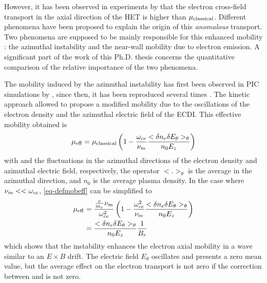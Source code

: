   However, it has been observed in experiments by \citet{meezan2001} that the electron cross-field transport in the axial direction of the \ac{HET} is higher than $\mu_{\mathrm{classical}}$.
  Different phenomena have been proposed to explain the origin of this \emph{anomalous} transport.
  Two phenomena are supposed to be mainly responsible for this enhanced mobility \citep{croes2017}\string: the azimuthal instability and the near-wall mobility due to electron emission.
  A significant part of the work of this Ph.D. thesis concerns the quantitative comparison of the relative importance of the two phenomena.
  
  The mobility induced by the azimuthal instability has first been observed in \ac{PIC} simulations by \citet{adam2004}, since then, it has been reproduced several times \citep{adam2008a,heron2013,lafleur2016a,croes2017,boeuf2018,taccogna2019}.
  The kinetic approach allowed \citet{lafleur2016a} to propose a modified mobility due to the oscillations of the electron density and the azimuthal electric field of the \ac{ECDI}.
  This effective mobility obtained is 
  \begin{equation} \label{eq-defmobeff}
    \mu_{\mathrm{eff}} = \mu_{\mathrm{classical}} \left( 1 - \frac{\omega_{ce}}{\nu_m}  \frac{< \delta n_e \delta E_{\theta} >_{\theta} }{n_0 E_z}   \right)
  \end{equation}
  with \dne{} and \dEt{} the fluctuations in the azimuthal directions of the electron density and azimuthal electric field, respectively, the operator $< . >_{\theta}$ is the average in the azimuthal direction, and $n_0$ is the average plasma density.
  In the case where $\nu_m << \omega_{ce}$, \cref{eq-defmobeff} can be simplified to 
  \begin{align} 
    \mu_{\mathrm{eff}} &= \frac{\frac{e}{m_e} \nu_m}{\omega_{ce}^2} \left( 1 - \frac{\omega_{ce}^2}{\nu_m}  \frac{< \delta n_e \delta E_{\theta} >_{\theta} }{n_0 E_z}   \right) \nonumber \\
    &= \frac{< \delta n_e \delta E_{\theta} >_{\theta} }{n_0 E_z}   \frac{1}{B_r} \label{eq-mobeffsimple}
  \end{align}
  which shows that the instability enhances the electron axial mobility in a wave similar to an $E \times B$ drift.
  The electric field $E_{\theta}$ oscillates and presents a zero mean value, but the average effect on the electron transport is not zero if the correction between \dEt{} and \dne{} is not zero.
  
